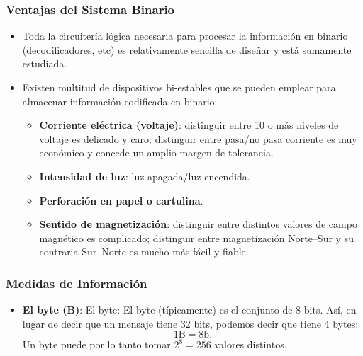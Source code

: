 \documentclass{beamer}
\begin{document}
\begin{frame}[fragile]\frametitle{Ventajas del Sistema Binario}
\begin{itemize}
	\item Toda la circuitería lógica necesaria para procesar la información en binario (decodificadores, etc) es relativamente sencilla de diseñar y está sumamente estudiada.

\item Existen multitud de dispositivos bi-estables que se pueden emplear para almacenar información codificada en binario:
\begin{itemize}
	\item \textbf{Corriente eléctrica (voltaje)}: distinguir entre 10 o más niveles de voltaje es delicado y caro; distinguir entre pasa/no pasa corriente es muy económico y concede un amplio margen de tolerancia.
	\item \textbf{Intensidad de luz}: luz apagada/luz encendida.
	\item \textbf{Perforación en papel o cartulina}.
	\item \textbf{Sentido de magnetización}: distinguir entre distintos valores de campo magnético es complicado; distinguir entre magnetización Norte--Sur y su contraria Sur--Norte es mucho más fácil y fiable.
\end{itemize}
\end{itemize}
\end{frame}


\begin{frame}[fragile]\frametitle{Medidas de Información}
\begin{itemize}
\item \textbf{El byte (B)}: El byte:  El byte (típicamente) es el conjunto de 8 bits. Así, en lugar de decir que un mensaje tiene 32 bits, podemos decir que tiene 4 bytes:
$$
1 \text{B} = 8 \text{b}.
$$
Un byte puede por lo tanto tomar $2^8=256$ valores distintos. 
\end{itemize}
\end{frame}
\end{document}
